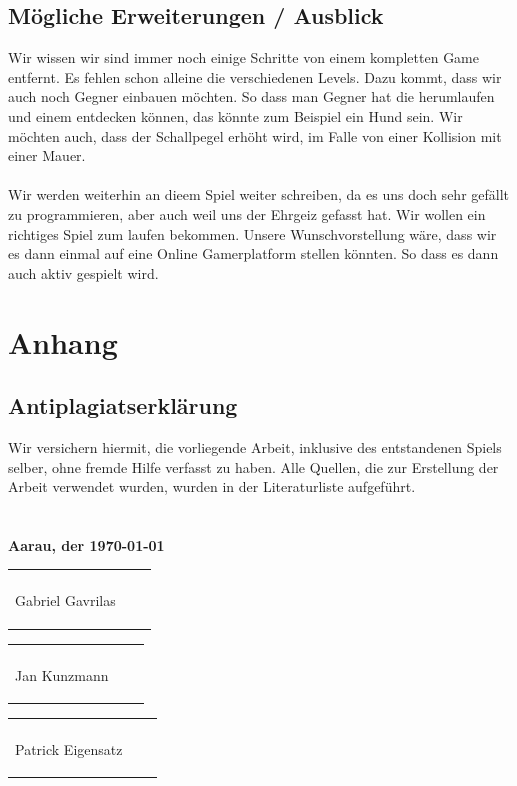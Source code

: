 \documentclass[11pt,a4paper]{scrbook}
\begin{document}
\chapter{Mögliche Erweiterungen / Ausblick}
Wir wissen wir sind immer noch einige Schritte von einem kompletten Game entfernt. Es fehlen schon alleine die verschiedenen Levels. Dazu kommt, dass wir auch noch Gegner einbauen möchten. So dass man Gegner hat die herumlaufen und einem entdecken können, das könnte zum Beispiel ein Hund sein. Wir möchten auch, dass der Schallpegel erhöht wird, im Falle von einer Kollision mit einer Mauer. 	
\\ 	
\\ 	
Wir werden weiterhin an dieem Spiel weiter schreiben, da es uns doch sehr gefällt zu programmieren, aber auch weil uns der Ehrgeiz gefasst hat. Wir wollen ein richtiges Spiel zum laufen bekommen. Unsere Wunschvorstellung wäre, dass wir es dann einmal auf eine Online Gamerplatform stellen könnten. So dass es dann auch aktiv gespielt wird. 


\clearpage
\part{Anhang}
\listoffigures

\clearpage

\printbibliography

\clearpage

\chapter*{Antiplagiatserklärung}
Wir versichern hiermit, die vorliegende Arbeit, inklusive des entstandenen Spiels
selber, ohne fremde Hilfe verfasst zu haben. Alle Quellen, die zur Erstellung
der Arbeit verwendet wurden, wurden in der Literaturliste aufgeführt.
\\\\\\
\textbf{Aarau, der \today}\\

\vspace{1 cm} 
\begin{tabular}{p{5cm}p{.5cm}l}
\dotfill \\ 
\begin{center}
Gabriel Gavrilas

\end{center}\end{tabular}%
\hfill 
\begin{tabular}{p{5cm}p{.5cm}l}
\dotfill \\ 
\begin{center}
Jan Kunzmann

\end{center}\end{tabular}%
\hfill 
\begin{tabular}{p{5cm}p{.5cm}l}
\dotfill \\ 
\begin{center}
Patrick Eigensatz
\end{center}
\end{tabular}%
  
\end{document}
